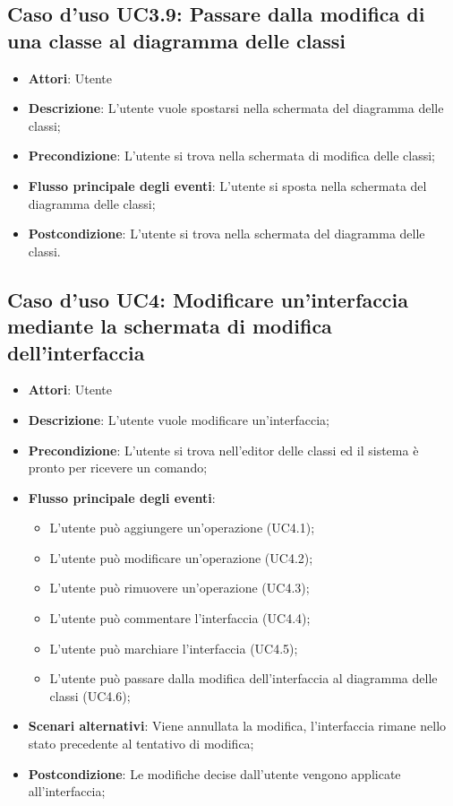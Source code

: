 \documentclass[../AnalisiDeiRequisiti.tex]{subfiles}
\begin{document}
			\subsection{Caso d'uso UC3.9: Passare dalla modifica di una classe al diagramma delle classi}
			\begin{itemize}
				\item \textbf{Attori}: Utente
				\item \textbf{Descrizione}: L'utente vuole spostarsi nella schermata del diagramma delle classi;
				\item \textbf{Precondizione}: L'utente si trova nella schermata di modifica delle classi;
				\item \textbf{Flusso principale degli eventi}: L'utente si sposta nella schermata del diagramma delle classi;
				\item \textbf{Postcondizione}: L'utente si trova nella schermata del diagramma delle classi.
			\end{itemize}
			\subsection{Caso d'uso UC4: Modificare un'interfaccia mediante la schermata di modifica dell'interfaccia}
			\begin{itemize}
				\item \textbf{Attori}: Utente
				\item \textbf{Descrizione}: L'utente vuole modificare un'interfaccia;
				\item \textbf{Precondizione}: L'utente si trova nell'editor delle classi ed il sistema è pronto per ricevere un comando;
				\item \textbf{Flusso principale degli eventi}: \begin{itemize}
					\item L'utente può aggiungere un'operazione (UC4.1);
					\item L'utente può modificare un'operazione (UC4.2);
					\item L'utente può rimuovere un'operazione (UC4.3);
					\item L'utente può commentare l'interfaccia (UC4.4);
					\item L'utente può marchiare l'interfaccia (UC4.5);
					\item L'utente può passare dalla modifica dell'interfaccia al diagramma delle classi (UC4.6);
				\end{itemize}
				\item \textbf{Scenari alternativi}: Viene annullata la modifica, l'interfaccia rimane nello stato precedente al tentativo di modifica;
				\item \textbf{Postcondizione}: Le modifiche decise dall'utente vengono applicate all'interfaccia;
			\end{itemize}
\end{document}

